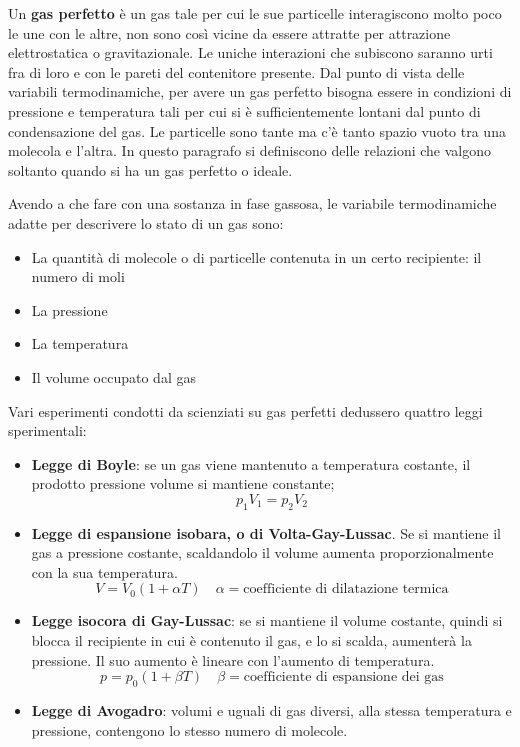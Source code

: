 Un \textbf{gas perfetto} è un gas tale per cui le sue particelle interagiscono molto poco le une con le altre, non sono così vicine da essere attratte per attrazione elettrostatica o gravitazionale. Le uniche interazioni che subiscono saranno urti fra di loro e con le pareti del contenitore presente. Dal punto di vista delle variabili termodinamiche, per avere un gas perfetto bisogna essere in condizioni di pressione e temperatura tali per cui si è sufficientemente lontani dal punto di condensazione del gas. Le particelle sono tante ma c'è tanto spazio vuoto tra una molecola e l'altra. In questo paragrafo si definiscono delle relazioni che valgono soltanto quando si ha un gas perfetto o ideale.

Avendo a che fare con una sostanza in fase gassosa, le variabile termodinamiche adatte per descrivere lo stato di un gas sono:

\begin{itemize}
	\item La quantità di molecole o di particelle contenuta in un certo recipiente: il numero di moli
	\item La pressione
	\item La temperatura
	\item Il volume occupato dal gas
\end{itemize}

Vari esperimenti condotti da scienziati su gas perfetti dedussero quattro leggi sperimentali:

\begin{itemize}
	\item \textbf{Legge di Boyle}: se un gas viene mantenuto a temperatura costante, il prodotto pressione volume si mantiene constante;
	\[ \boxed{p_1 V_1=p_2 V_2} \]
	\item \textbf{Legge di espansione isobara, o di Volta-Gay-Lussac}. Se si mantiene il gas a pressione costante, scaldandolo il volume aumenta proporzionalmente con la sua temperatura.
	\[ \boxed{V=V_0(1+\alpha T) } \quad \alpha = \text{coefficiente di dilatazione termica} \]
	\item \textbf{Legge isocora di Gay-Lussac}: se si mantiene il volume costante, quindi si blocca il recipiente in cui è contenuto il gas, e lo si scalda, aumenterà la pressione. Il suo aumento è lineare con l'aumento di temperatura.
	\[ \boxed{p=p_0(1+\beta T) } \quad \beta = \text{coefficiente di espansione dei gas} \]
	\item \textbf{Legge di Avogadro}: volumi e uguali di gas diversi, alla stessa temperatura e pressione, contengono lo stesso numero di molecole.
\end{itemize}

